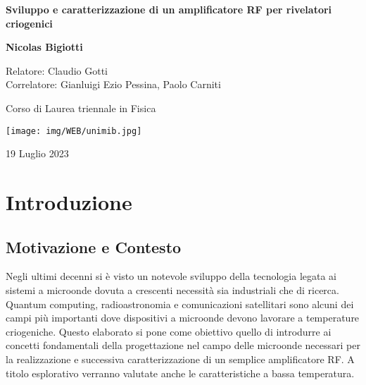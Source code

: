 \documentclass[12pt,oneside]{book}
\begin{document}
\begin{titlepage}
    \begin{center}
        \vspace*{1cm}
            
        \Huge
        \textbf{Sviluppo e caratterizzazione di un amplificatore RF per rivelatori criogenici}
            
        \vspace{0.5cm}
        \LARGE
            
        \vspace{1.5cm}
            
        \textbf{Nicolas Bigiotti}
            
        \vfill

        
        Relatore: Claudio Gotti \hspace{30pt} \dotfill\\
        Correlatore: Gianluigi Ezio Pessina, Paolo Carniti
            
        \vspace{0.8cm}

        Corso di Laurea triennale in Fisica
            
        \vspace{0.8cm}
            
        \texttt{[image: img/WEB/unimib.jpg]}

            
        \Large
        19 Luglio 2023
            
    \end{center}
\end{titlepage}
\restoregeometry 

\tableofcontents

\chapter{Introduzione}
\section{Motivazione e Contesto}
Negli ultimi decenni si è visto un notevole sviluppo della tecnologia legata ai sistemi a microonde dovuta a crescenti necessità sia industriali che di ricerca.
Quantum computing, radioastronomia e comunicazioni satellitari sono alcuni dei campi più importanti dove dispositivi a microonde devono lavorare a temperature
criogeniche. Questo elaborato si pone come obiettivo quello di introdurre ai concetti fondamentali della progettazione nel campo delle microonde necessari per
la realizzazione e successiva caratterizzazione di un semplice amplificatore RF. A titolo esplorativo verranno valutate anche le caratteristiche a bassa
temperatura.
\end{document}

